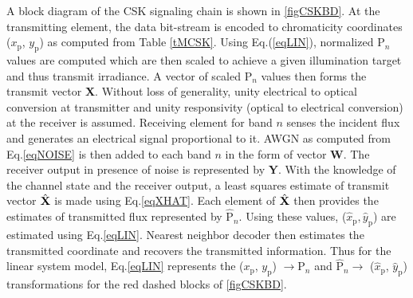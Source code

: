 \documentclass[10pt,letterpaper]{article}
\newcommand{\vm}[1]{{\bf{#1}}}
\begin{document}
A block diagram of the CSK signaling chain is shown in \figurename{ }\ref{figCSKBD}. At the transmitting element, the data bit-stream is encoded to chromaticity coordinates ($x_{\text{p}}$, $y_{\text{p}}$) as computed from Table \ref{tMCSK}. Using Eq.(\ref{eqLIN}), normalized P$_{n}$ values are computed which are then scaled to achieve a given illumination target and thus transmit irradiance. A vector of scaled P$_{n}$ values then forms the transmit vector \vm{X}. Without loss of generality, unity electrical to optical conversion at transmitter and unity responsivity (optical to electrical conversion) at the receiver is assumed. Receiving element for band $n$ senses the incident flux and generates an electrical signal proportional to it. AWGN as computed from Eq.\eqref{eqNOISE} is then added to each band $n$ in the form of vector \vm{W}. The receiver output in presence of noise is represented by \vm{Y}. With the knowledge of the channel state and the receiver output, a least squares estimate of transmit vector $\hat{\vm{X}}$ is made using Eq.\eqref{eqXHAT}. Each element of $\hat{\vm{X}}$ then provides the estimates of transmitted flux represented by $\hat{\text{P}}_{n}$. Using these values, ($\hat{x}_{\text{p}}, \hat{y}_{\text{p}}$) are estimated using Eq.\eqref{eqLIN}. Nearest neighbor decoder then estimates the transmitted coordinate and recovers the transmitted information. Thus for the linear system model, Eq.\eqref{eqLIN} represents the ($x_{\text{p}}$, $y_{\text{p}}$) $\rightarrow  \text{P}_{n}$ and $\hat{\text{P}}_{n}\rightarrow$ ($\hat{x}_{\text{p}}$, $\hat{y}_{\text{p}}$) transformations for the red dashed blocks of \figurename{ }\ref{figCSKBD}.
  
\end{document}
